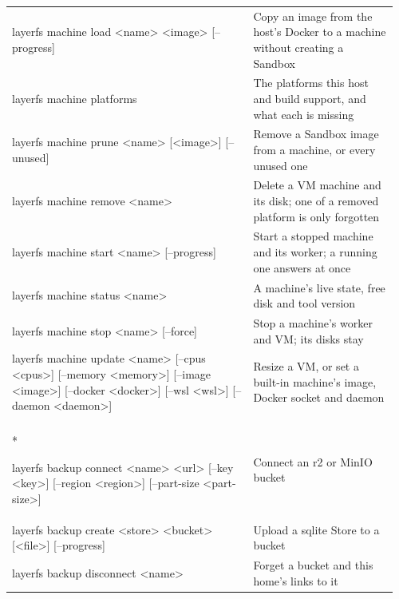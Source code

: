 {\begin{longtable}{@{}p{0.60\linewidth}@{\hspace{1em}}p{0.36\linewidth}@{}}
{\raggedright\ttfamily layerfs machine load \textless{}name\textgreater{} \textless{}image\textgreater{} [--progress]} & Copy an image from the host's Docker to a machine without creating a Sandbox \\
{\raggedright\ttfamily layerfs machine platforms} & The platforms this host and build support, and what each is missing \\
{\raggedright\ttfamily layerfs machine prune \textless{}name\textgreater{} [\textless{}image\textgreater{}] [--unused]} & Remove a Sandbox image from a machine, or every unused one \\
{\raggedright\ttfamily layerfs machine remove \textless{}name\textgreater{}} & Delete a VM machine and its disk; one of a removed platform is only forgotten \\
{\raggedright\ttfamily layerfs machine start \textless{}name\textgreater{} [--progress]} & Start a stopped machine and its worker; a running one answers at once \\
{\raggedright\ttfamily layerfs machine status \textless{}name\textgreater{}} & A machine's live state, free disk and tool version \\
{\raggedright\ttfamily layerfs machine stop \textless{}name\textgreater{} [--force]} & Stop a machine's worker and VM; its disks stay \\
{\raggedright\ttfamily layerfs machine update \textless{}name\textgreater{} [--cpus \textless{}cpus\textgreater{}] [--memory \textless{}memory\textgreater{}] [--image \textless{}image\textgreater{}] [--docker \textless{}docker\textgreater{}] [--wsl \textless{}wsl\textgreater{}] [--daemon \textless{}daemon\textgreater{}]} & Resize a VM, or set a built-in machine's image, Docker socket and daemon \\
\addlinespace
\multicolumn{2}{@{}l}{\textbf{Backups} (5)}\\*
{\raggedright\ttfamily layerfs backup connect \textless{}name\textgreater{} \textless{}url\textgreater{} [--key \textless{}key\textgreater{}] [--region \textless{}region\textgreater{}] [--part-size \textless{}part-size\textgreater{}]} & Connect an r2 or MinIO bucket \\
{\raggedright\ttfamily layerfs backup create \textless{}store\textgreater{} \textless{}bucket\textgreater{} [\textless{}file\textgreater{}] [--progress]} & Upload a sqlite Store to a bucket \\
{\raggedright\ttfamily layerfs backup disconnect \textless{}name\textgreater{}} & Forget a bucket and this home's links to it \\

\end{longtable}}
